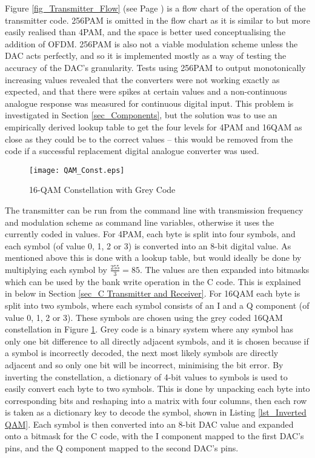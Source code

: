 \documentclass[../main.tex]{subfiles}
\begin{document}
Figure \ref{fig_Transmitter_Flow} (see Page \pageref{fig_Transmitter_Flow}) is a flow chart of the operation of the transmitter code.
256PAM is omitted in the flow chart as it is similar to but more easily realised than 4PAM, and the space is better used conceptualising the addition of OFDM.
256PAM is also not a viable modulation scheme unless the DAC acts perfectly, and so it is implemented mostly as a way of testing the accuracy of the DAC's granularity.
Tests using 256PAM to output monotonically increasing values revealed that the converters were not working exactly as expected, and that there were spikes at certain values and a non-continuous analogue response was measured for continuous digital input.
This problem is investigated in Section \ref{sec_Components}, but the solution was to use an empirically derived lookup table to get the four levels for 4PAM and 16QAM as close as they could be to the correct values -- this would be removed from the code if a successful replacement digital analogue converter was used.\\

\begin{figure}[ht]
	\centering
	\texttt{[image: QAM\_Const.eps]}
	\caption{16-QAM Constellation with Grey Code}
	\label{fig_QAM Constellation}
\end{figure}

The transmitter can be run from the command line with transmission frequency and modulation scheme as command line variables, otherwise it uses the currently coded in values.
For 4PAM, each byte is split into four symbols, and each symbol (of value 0, 1, 2 or 3) is converted into an 8-bit digital value.
As mentioned above this is done with a lookup table, but would ideally be done by multiplying each symbol by $\frac{255}{3} = 85$.
The values are then expanded into bitmasks which can be used by the bank write operation in the C code.
This is explained in below in Section \ref{sec_C Transmitter and Receiver}.
For 16QAM each byte is split into two symbols, where each symbol consists of an I and a Q component (of value 0, 1, 2 or 3).
These symbols are chosen using the grey coded 16QAM constellation in Figure \ref{fig_QAM Constellation}.
Grey code is a binary system where any symbol has only one bit difference to all directly adjacent symbols, and it is chosen because if a symbol is incorrectly decoded, the next most likely symbols are directly adjacent and so only one bit will be incorrect, minimising the bit error.
By inverting the constellation, a dictionary of 4-bit values to symbols is used to easily convert each byte to two symbols.
This is done by unpacking each byte into corresponding bits and reshaping into a matrix with four columns, then each row is taken as a dictionary key to decode the symbol, shown in Listing \ref{lst_Inverted QAM}.
Each symbol is then converted into an 8-bit DAC value and expanded onto a bitmask for the C code, with the I component mapped to the first DAC's pins, and the Q component mapped to the second DAC's pins.\\
\end{document}
